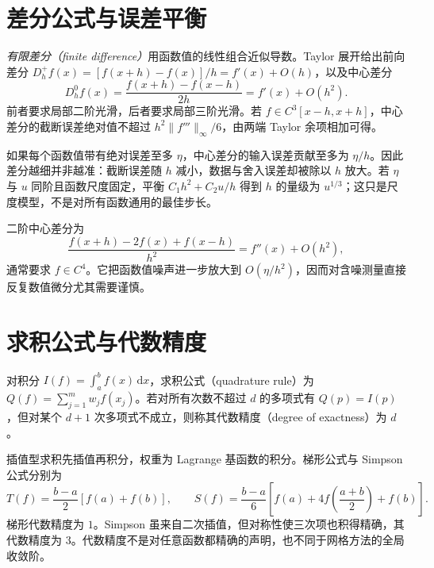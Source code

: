\documentclass[UTF8,12pt,a4paper,fontset=fandol]{ctexbook}
\begin{document}
\section{差分公式与误差平衡}
\emph{有限差分（finite difference）}用函数值的线性组合近似导数。Taylor 展开给出前向差分 $D_h^+f(x)=[f(x+h)-f(x)]/h=f'(x)+O(h)$，以及中心差分
\begin{equation}
 D_h^0f(x)=\frac{f(x+h)-f(x-h)}{2h}=f'(x)+O(h^2).
 \label{eq:na-central-difference}
\end{equation}
前者要求局部二阶光滑，后者要求局部三阶光滑。若 $f\in C^3[x-h,x+h]$，中心差分的截断误差绝对值不超过 $h^2\|f'''\|_\infty/6$，由两端 Taylor 余项相加可得。

如果每个函数值带有绝对误差至多 $\eta$，中心差分的输入误差贡献至多为 $\eta/h$。因此差分越细并非越准：截断误差随 $h$ 减小，数据与舍入误差却被除以 $h$ 放大。若 $\eta$ 与 $u$ 同阶且函数尺度固定，平衡 $C_1h^2+C_2u/h$ 得到 $h$ 的量级为 $u^{1/3}$；这只是尺度模型，不是对所有函数通用的最佳步长。

二阶中心差分为
\[
 \frac{f(x+h)-2f(x)+f(x-h)}{h^2}=f''(x)+O(h^2),
\]
通常要求 $f\in C^4$。它把函数值噪声进一步放大到 $O(\eta/h^2)$，因而对含噪测量直接反复数值微分尤其需要谨慎。

\section{求积公式与代数精度}
\begin{definition}[求积公式的代数精度]
对积分 $I(f)=\int_a^bf(x)\,\mathrm dx$，求积公式（quadrature rule）为 $Q(f)=\sum_{j=1}^m w_jf(x_j)$。若对所有次数不超过 $d$ 的多项式有 $Q(p)=I(p)$，但对某个 $d+1$ 次多项式不成立，则称其代数精度（degree of exactness）为 $d$。
\end{definition}
插值型求积先插值再积分，权重为 Lagrange 基函数的积分。梯形公式与 Simpson 公式分别为
\[
 T(f)=\frac{b-a}{2}[f(a)+f(b)],\qquad
 S(f)=\frac{b-a}{6}\left[f(a)+4f\left(\frac{a+b}{2}\right)+f(b)\right].
\]
梯形代数精度为 $1$。Simpson 虽来自二次插值，但对称性使三次项也积得精确，其代数精度为 $3$。代数精度不是对任意函数都精确的声明，也不同于网格方法的全局收敛阶。
\end{document}
